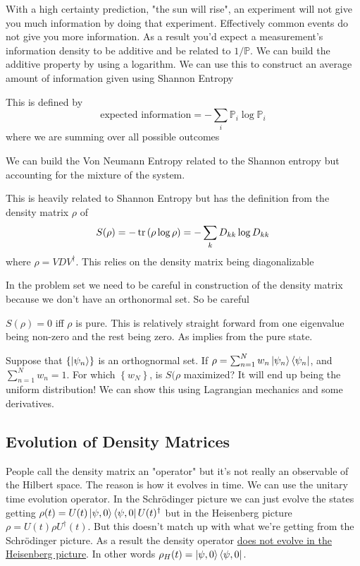 With a high certainty prediction, "the sun will rise", an experiment
will not give you much information by doing that experiment. Effectively
common events do not give you more information. As a result you'd
expect a measurement's information density to be additive and
be related to $1/\mathbb{P}$. We can build the additive property
by using a logarithm. We can use this to construct an average amount of information
given using Shannon Entropy
\begin{definition}
\label{shannon}
This is defined by
$$
    \text{expected information} = -\sum_i \mathbb{P}_i \log \mathbb{P}_i
$$
where we are summing over all possible outcomes
\end{definition}

We can build the Von Neumann Entropy related to the Shannon entropy but
accounting for the mixture of the system.
\begin{definition}
\label{vonNeumann}
This is heavily related to Shannon Entropy but has the definition from
the density matrix $\rho$ of
$$
    S(\rho) = - \operatorname{tr} \left(\rho \log \rho\right) =
    - \sum_k D_{kk} \log D_{kk}
$$
where $\rho = V D V^\dagger$. This relies on the density matrix being diagonalizable
\end{definition}
In the problem set we need to be careful in construction of the
density matrix because we don't have an orthonormal set. So be careful

\begin{corollary}
$S(\rho) = 0$ iff $\rho$ is pure. This is relatively straight forward
from one eigenvalue being non-zero and the rest being zero. As implies
from the pure state.
\end{corollary}

Suppose that $\left\{\Ket{\psi_n}\right\}$ is an orthognormal set.
If $\rho = \sum_{n=1}^{N} w_n \Ket{\psi_n} \Bra{\psi_n}$, and
$\sum_{n=1}^N w_n = 1$. For which 
$\left\{w_N\right\}$, is $S(\rho$ maximized? It will end up being
the uniform distribution! We can show this using Lagrangian mechanics
and some derivatives. 

\subsection{Evolution of Density Matrices}
People call the density matrix an "operator" but it's not really
an observable of the Hilbert space. The reason is how it evolves in time.
We can use the unitary time evolution operator. In the Schr\"odinger
picture we can just evolve the states getting
$\rho(t) = U(t) \Ket{\psi, 0}\Bra{\psi, 0} U(t)^\dagger$
but in the Heisenberg picture
$\rho = U(t) \rho U^\dagger(t)$. But this doesn't match
up with what we're getting from the Schr\"odinger picture.
As a result the density operator \underline{does not evolve in 
the Heisenberg picture}. In other words
$\rho_H (t) = \Ket{\psi, 0}\Bra{\psi, 0}$.

